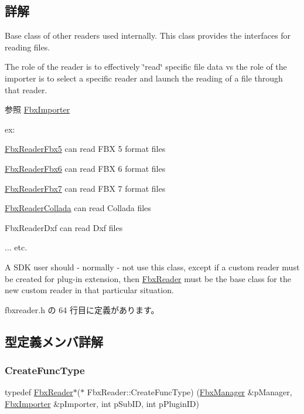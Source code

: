 \subsection{詳解}
Base class of other readers used internally. This class provides the interfaces for reading files.

The role of the reader is to effectively \char`\"{}read\char`\"{} specific file data vs the role of the importer is to select a specific reader and launch the reading of a file through that reader. \begin{DoxySeeAlso}{参照}
\hyperlink{class_fbx_importer}{Fbx\+Importer}
\end{DoxySeeAlso}
ex\+:
\begin{DoxyItemize}
\item \hyperlink{class_fbx_reader_fbx5}{Fbx\+Reader\+Fbx5} can read F\+BX 5 format files
\item \hyperlink{class_fbx_reader_fbx6}{Fbx\+Reader\+Fbx6} can read F\+BX 6 format files
\item \hyperlink{class_fbx_reader_fbx7}{Fbx\+Reader\+Fbx7} can read F\+BX 7 format files
\item \hyperlink{class_fbx_reader_collada}{Fbx\+Reader\+Collada} can read Collada files
\item Fbx\+Reader\+Dxf can read Dxf files
\item ... etc.
\end{DoxyItemize}

A S\+DK user should -\/ normally -\/ not use this class, except if a custom reader must be created for plug-\/in extension, then \hyperlink{class_fbx_reader}{Fbx\+Reader} must be the base class for the new custom reader in that particular situation. 

 fbxreader.\+h の 64 行目に定義があります。



\subsection{型定義メンバ詳解}
\mbox{\label{class_fbx_reader_a83acaa910ced3876e5e232ff17f62c45}} 
\subsubsection{\texorpdfstring{Create\+Func\+Type}{CreateFuncType}}
{\footnotesize\ttfamily typedef \hyperlink{class_fbx_reader}{Fbx\+Reader}$\ast$($\ast$ Fbx\+Reader\+::\+Create\+Func\+Type) (\hyperlink{class_fbx_manager}{Fbx\+Manager} \&p\+Manager, \hyperlink{class_fbx_importer}{Fbx\+Importer} \&p\+Importer, int p\+Sub\+ID, int p\+Plugin\+ID)}



